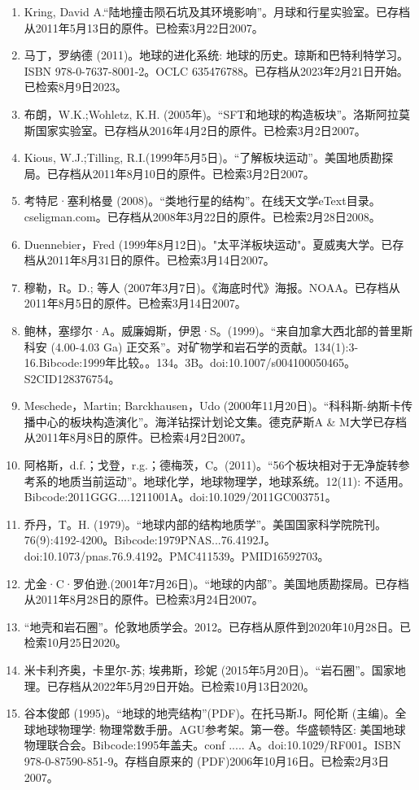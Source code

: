 \begin{enumerate}
\item Kring, David A.“陆地撞击陨石坑及其环境影响”。月球和行星实验室。已存档从2011年5月13日的原件。已检索3月22日2007。
\item 马丁，罗纳德 (2011)。地球的进化系统: 地球的历史。琼斯和巴特利特学习。ISBN 978-0-7637-8001-2。OCLC 635476788。已存档从2023年2月21日开始。已检索8月9日2023。
\item 布朗，W.K.;Wohletz, K.H. (2005年)。“SFT和地球的构造板块”。洛斯阿拉莫斯国家实验室。已存档从2016年4月2日的原件。已检索3月2日2007。
\item Kious, W.J.;Tilling, R.I.(1999年5月5日)。“了解板块运动”。美国地质勘探局。已存档从2011年8月10日的原件。已检索3月2日2007。
\item 考特尼·塞利格曼 (2008)。“类地行星的结构”。在线天文学eText目录。cseligman.com。已存档从2008年3月22日的原件。已检索2月28日2008。
\item Duennebier，Fred (1999年8月12日)。"太平洋板块运动"。夏威夷大学。已存档从2011年8月31日的原件。已检索3月14日2007。
\item 穆勒，R。D.; 等人 (2007年3月7日)。《海底时代》海报。NOAA。已存档从2011年8月5日的原件。已检索3月14日2007。
\item 鲍林，塞缪尔·A。威廉姆斯，伊恩·S。(1999)。“来自加拿大西北部的普里斯科安 (4.00-4.03 Ga) 正交系”。对矿物学和岩石学的贡献。134(1):3-16.Bibcode:1999年比较。。134。3B。doi:10.1007/s004100050465。S2CID128376754。 
\item Meschede，Martin; Barckhausen，Udo (2000年11月20日)。“科科斯-纳斯卡传播中心的板块构造演化”。海洋钻探计划论文集。德克萨斯A & M大学已存档从2011年8月8日的原件。已检索4月2日2007。
\item 阿格斯，d.f.；戈登，r.g.；德梅茨，C。(2011)。“56个板块相对于无净旋转参考系的地质当前运动”。地球化学，地球物理学，地球系统。12(11): 不适用。Bibcode:2011GGG....1211001A。doi:10.1029/2011GC003751。
\item 乔丹，T。H. (1979)。“地球内部的结构地质学”。美国国家科学院院刊。76(9):4192-4200。Bibcode:1979PNAS...76.4192J。doi:10.1073/pnas.76.9.4192。PMC411539。PMID16592703。  
\item 尤金·C·罗伯逊.(2001年7月26日)。“地球的内部”。美国地质勘探局。已存档从2011年8月28日的原件。已检索3月24日2007。
\item “地壳和岩石圈”。伦敦地质学会。2012。已存档从原件到2020年10月28日。已检索10月25日2020。
\item 米卡利齐奥，卡里尔-苏; 埃弗斯，珍妮 (2015年5月20日)。“岩石圈”。国家地理。已存档从2022年5月29日开始。已检索10月13日2020。
\item 谷本俊郎 (1995)。“地球的地壳结构”(PDF)。在托马斯J。阿伦斯 (主编)。全球地球物理学: 物理常数手册。AGU参考架。第一卷。华盛顿特区: 美国地球物理联合会。Bibcode:1995年盖夫。conf ..... A。doi:10.1029/RF001。ISBN  978-0-87590-851-9。存档自原来的 (PDF)2006年10月16日。已检索2月3日2007。

\end{enumerate}
